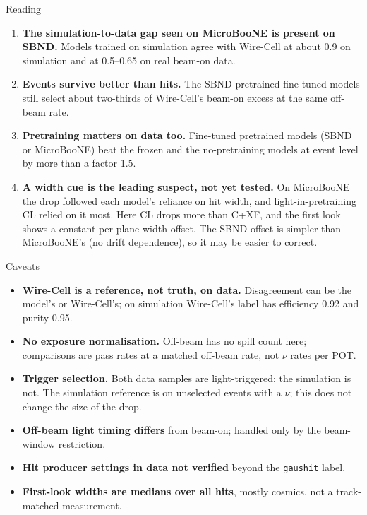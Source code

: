 \documentclass[aspectratio=169,10pt]{beamer}
\newcommand{\code}[1]{\texttt{#1}}
\begin{document}
\begin{frame}{Reading}
  \footnotesize
  \begin{enumerate}\setlength{\itemsep}{6pt}
    \item \textbf{The simulation-to-data gap seen on MicroBooNE is present on SBND.} Models trained on simulation agree with Wire-Cell at
      about 0.9 on simulation and at 0.5--0.65 on real beam-on data.
    \item \textbf{Events survive better than hits.} The SBND-pretrained fine-tuned models still select about two-thirds of Wire-Cell's
      beam-on excess at the same off-beam rate.
    \item \textbf{Pretraining matters on data too.} Fine-tuned pretrained models (SBND or MicroBooNE) beat the frozen and the
      no-pretraining models at event level by more than a factor 1.5.
    \item \textbf{A width cue is the leading suspect, not yet tested.} On MicroBooNE the drop followed each model's reliance on hit
      width, and light-in-pretraining CL relied on it most. Here CL drops more than C+XF, and the first look shows a constant
      per-plane width offset. The SBND offset is simpler than MicroBooNE's (no drift dependence), so it may be easier to correct.
  \end{enumerate}
\end{frame}

\begin{frame}{Caveats}
  \footnotesize
  \begin{itemize}\setlength{\itemsep}{5pt}
    \item \textbf{Wire-Cell is a reference, not truth, on data.} Disagreement can be the model's or Wire-Cell's; on simulation
      Wire-Cell's label has efficiency 0.92 and purity 0.95.
    \item \textbf{No exposure normalisation.} Off-beam has no spill count here; comparisons are pass rates at a matched off-beam
      rate, not $\nu$ rates per POT.
    \item \textbf{Trigger selection.} Both data samples are light-triggered; the simulation is not. The simulation reference is on
      unselected events with a $\nu$; this does not change the size of the drop.
    \item \textbf{Off-beam light timing differs} from beam-on; handled only by the beam-window restriction.
    \item \textbf{Hit producer settings in data not verified} beyond the \code{gaushit} label.
    \item \textbf{First-look widths are medians over all hits}, mostly cosmics, not a track-matched measurement.
  \end{itemize}
\end{frame}
\end{document}
